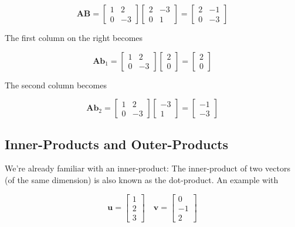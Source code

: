 \documentclass[main.tex]{subfiles}
\begin{document}
$$
\mathbf{A B}=\left[\begin{array}{cc}
1 & 2 \\
0 & -3
\end{array}\right]\left[\begin{array}{cc}
2 & -3 \\
0 & 1
\end{array}\right]=\left[\begin{array}{cc}
2 & -1 \\
0 & -3
\end{array}\right]
$$

The first column on the right becomes

$$
\mathbf{A} \mathbf{b}_{1}=\left[\begin{array}{cc}
1 & 2 \\
0 & -3
\end{array}\right]\left[\begin{array}{l}
2 \\
0
\end{array}\right]=\left[\begin{array}{l}
2 \\
0
\end{array}\right]
$$

The second column becomes

$$
\mathbf{A} \mathbf{b}_{2}=\left[\begin{array}{cc}
1 & 2 \\
0 & -3
\end{array}\right]\left[\begin{array}{c}
-3 \\
1
\end{array}\right]=\left[\begin{array}{l}
-1 \\
-3
\end{array}\right]
$$

\subsection{Inner-Products and Outer-Products}

We're already familiar with an inner-product: The inner-product of two vectors (of the same dimension) is also known as the dot-product. An example with

$$
\mathbf{u}=\left[\begin{array}{l}
1 \\
2 \\
3
\end{array}\right] \quad \mathbf{v}=\left[\begin{array}{r}
0 \\
-1 \\
2
\end{array}\right]
$$
\end{document}
